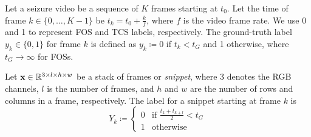 Let a seizure video be a sequence of $K$ frames starting at $t_0$.
Let the time of frame $k \in \{ 0, \dots, K - 1 \}$ be ${t_k = t_0 + \frac{k}{f}}$, where $f$ is the video frame rate.
We use 0 and 1 to represent \ac{FOS} and \ac{TCS} labels, respectively.
The ground-truth label $y_k \in \{0, 1\}$ for frame $k$ is defined as $y_k \coloneqq 0$ if $t_k < t_G$ and 1 otherwise, where $t_G \rightarrow \infty$ for \acp{FOS}.

Let $\mathbf{x} \in \mathbb{R} ^ {3 \times l \times h \times w}$ be a stack of frames or \textit{snippet}, where
$3$ denotes the RGB channels,
$l$ is the number of frames,
and $h$ and $w$ are the number of rows and columns in a frame, respectively.
The label for a snippet starting at frame $k$ is
\begin{equation}
  Y_k \coloneqq
  \left\{
    \begin{array}{ll}
      0 & \mbox{if } \frac{t_k + t_{k + l}}{2} < t_G \\
      1 & \mbox{otherwise}
    \end{array}
  \right.
\end{equation}

